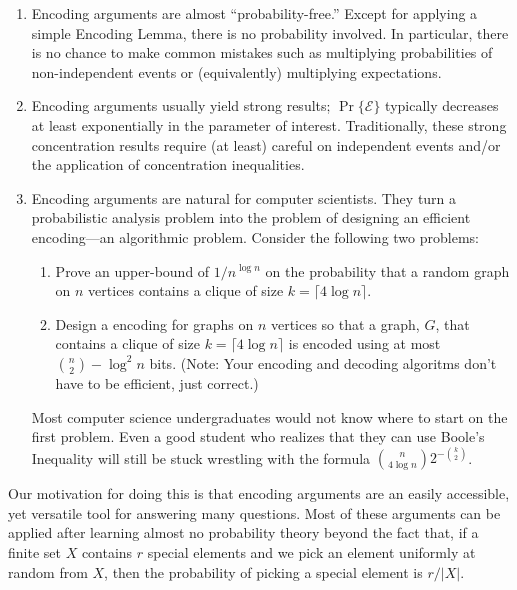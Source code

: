 \documentclass[lotsofwhite]{patmorin}
\begin{document}
\begin{enumerate}
  \item Encoding arguments are almost ``probability-free.''  Except for
  applying a simple Encoding Lemma, there is no probability involved.
  In particular, there is no chance to make common mistakes such as
  multiplying probabilities of non-independent events or (equivalently)
  multiplying expectations.

  \item Encoding arguments usually yield strong results;
  $\Pr\{\mathcal{E}\}$ typically decreases at least exponentially in
  the parameter of interest. Traditionally, these strong concentration
  results require (at least) careful on independent events and/or the
  application of concentration inequalities.
  
  \item Encoding arguments are natural for computer scientists. They
  turn a probabilistic analysis problem into the problem of designing an
  efficient encoding---an algorithmic problem. Consider the following 
  two problems:
    \begin{enumerate}

    \item Prove an upper-bound of $1/n^{\log n}$ on the probability that
       a random graph on $n$ vertices contains a clique of size $k=\lceil
       4\log n\rceil$.

    \item Design a encoding for graphs on $n$ vertices so that a graph,
       $G$, that contains a clique of size $k=\lceil 4\log n\rceil$
       is encoded using at most $\binom{n}{2}-\log^2 n$ bits. (Note:
       Your encoding and decoding algoritms don't have to be efficient,
       just correct.)
    \end{enumerate}
  Most computer science undergraduates would not know where to start
  on the first problem.  Even a good student who realizes that
  they can use Boole's Inequality will still be stuck
  wrestling with the formula $\binom{n}{4\log n}2^{-\binom{k}{2}}$.  
\end{enumerate}

Our motivation for doing this is that encoding arguments are an easily
accessible, yet versatile tool for answering many questions.  Most of
these arguments can be applied after learning almost no probability
theory beyond the fact that, if a finite set $X$ contains $r$ special
elements and we pick an element uniformly at random from $X$, then the
probability of picking a special element is $r/|X|$.
\end{document}
